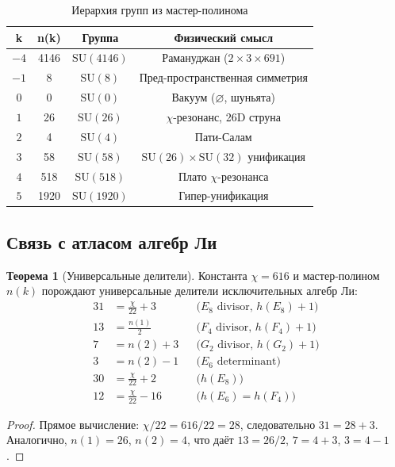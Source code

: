 \documentclass[12pt,a4paper,twoside]{article}
\newcommand{\SU}{\mathrm{SU}}
\theoremstyle{definition}
\newtheorem{theorem}{Теорема}[section]
\begin{document}
\begin{table}[H]
\centering
\small
\caption{Иерархия групп из мастер-полинома}
\label{tab:hierarchy}
\begin{tabular}{c|c|c|c}
\toprule
\textbf{k} & \textbf{n(k)} & \textbf{Группа} & \textbf{Физический смысл} \\
\midrule
$-4$ & 4146 & $\SU(4146)$ & Рамануджан ($2 \times 3 \times 691$) \\
$-1$ & 8 & $\SU(8)$ & Пред-пространственная симметрия \\
$0$ & 0 & $\SU(0)$ & Вакуум ($\varnothing$, шуньята) \\
$1$ & 26 & $\SU(26)$ & $\chi$-резонанс, 26D струна \\
$2$ & 4 & $\SU(4)$ & Пати-Салам \\
$3$ & 58 & $\SU(58)$ & $\SU(26) \times \SU(32)$ унификация \\
$4$ & 518 & $\SU(518)$ & Плато $\chi$-резонанса \\
$5$ & 1920 & $\SU(1920)$ & Гипер-унификация \\
\bottomrule
\end{tabular}
\end{table}

\subsection{Связь с атласом алгебр Ли}

\begin{theorem}[Универсальные делители]
Константа $\chi = 616$ и мастер-полином $n(k)$ порождают универсальные делители исключительных алгебр Ли:
\begin{equation}
\boxed{
\begin{aligned}
31 &= \frac{\chi}{22} + 3 && \text{($E_8$ divisor, $h(E_8) + 1$)} \\
13 &= \frac{n(1)}{2} && \text{($F_4$ divisor, $h(F_4) + 1$)} \\
7 &= n(2) + 3 && \text{($G_2$ divisor, $h(G_2) + 1$)} \\
3 &= n(2) - 1 && \text{($E_6$ determinant)} \\
30 &= \frac{\chi}{22} + 2 && \text{($h(E_8)$)} \\
12 &= \frac{\chi}{22} - 16 && \text{($h(E_6) = h(F_4)$)}
\end{aligned}
}
\label{eq:divisors}
\end{equation}
\end{theorem}

\begin{proof}
Прямое вычисление: $\chi/22 = 616/22 = 28$, следовательно $31 = 28 + 3$. Аналогично, $n(1) = 26$, $n(2) = 4$, что даёт $13 = 26/2$, $7 = 4 + 3$, $3 = 4 - 1$.
\end{proof}
\end{document}
